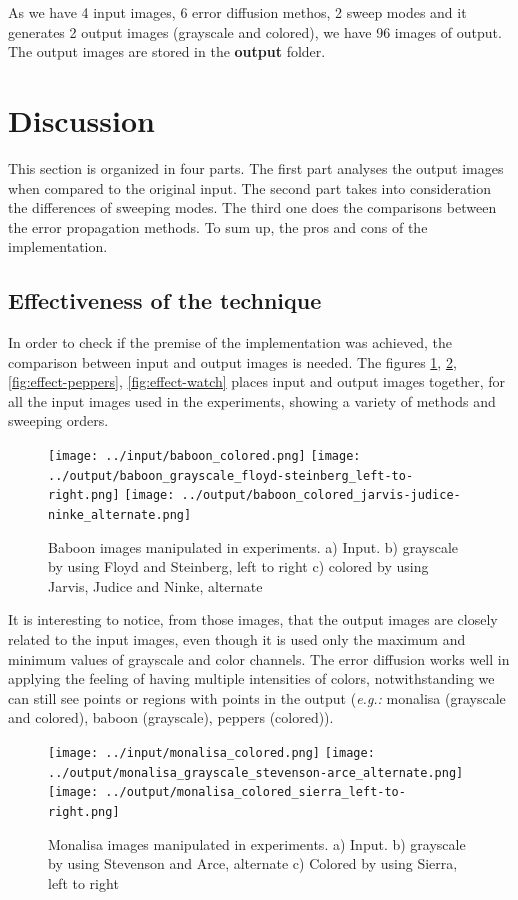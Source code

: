 \documentclass[]{IEEEtran}
\begin{document}
As we have 4 input images, 6 error diffusion methos, 2 sweep modes and it generates 2 output images (grayscale and colored), we have 96 images of output. The output images are stored in the \textbf{output} folder.

\section{Discussion}
This section is organized in four parts. The first part analyses the output images when compared to the original input. The second part takes into consideration the differences of sweeping modes. The third one does the comparisons between the error propagation methods. To sum up, the pros and cons of the implementation.

\subsection{Effectiveness of the technique}
In order to check if the premise of the implementation was achieved, the comparison between input and output images is needed. The figures \ref{fig:effect-baboon}, \ref{fig:effect-monalisa}, \ref{fig:effect-peppers}, \ref{fig:effect-watch} places input and output images together, for all the input images used in the experiments, showing a variety of methods and sweeping orders. 

\begin{figure}[H]
  \centering
  \texttt{[image: ../input/baboon\_colored.png]}
  \texttt{[image: ../output/baboon\_grayscale\_floyd-steinberg\_left-to-right.png]}
  \texttt{[image: ../output/baboon\_colored\_jarvis-judice-ninke\_alternate.png]}
  \caption{Baboon images manipulated in experiments. a) Input. b) grayscale by using Floyd and Steinberg, left to right c) colored by using Jarvis, Judice and Ninke, alternate}
  \label{fig:effect-baboon}
\end{figure}

It is interesting to notice, from those images, that the output images are closely related to the input images, even though it is used only the maximum and minimum values of grayscale and color channels. The error diffusion works well in applying the feeling of having multiple intensities of colors, notwithstanding we can still see points or regions with points in the output (\textit{e.g.:} monalisa (grayscale and colored), baboon (grayscale), peppers (colored)).  

\begin{figure}[H]
  \centering
  \texttt{[image: ../input/monalisa\_colored.png]}
  \texttt{[image: ../output/monalisa\_grayscale\_stevenson-arce\_alternate.png]}
  \texttt{[image: ../output/monalisa\_colored\_sierra\_left-to-right.png]}
  \caption{Monalisa images manipulated in experiments. a) Input. b) grayscale by using Stevenson and Arce, alternate c) Colored by using Sierra, left to right}
  \label{fig:effect-monalisa}
\end{figure}
\end{document}
